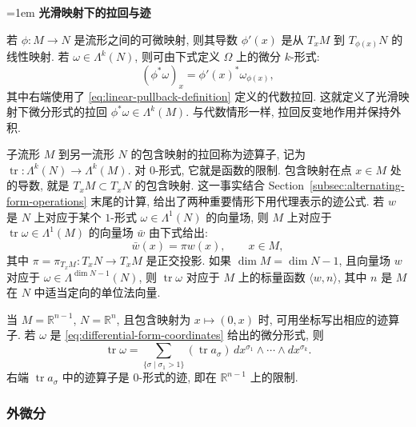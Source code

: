 \begingroup\emergencystretch=1em
\medskip\noindent\textbf{{光滑映射下的拉回与迹}}\par
{若 $\phi:M\to N$ 是流形之间的可微映射, 则其导数 $\phi'(x)$ 是从 $T_xM$ 到 $T_{\phi(x)}N$ 的线性映射. 若 $\omega\in\Lambda^k(N)$, 则可由下式定义 $\Omega$ 上的微分 $k$-形式:}
\begin{equation}\label{eq:smooth-pullback-definition}
(\phi^*\omega)_x=\phi'(x)^*\omega_{\phi(x)},
\end{equation}
{其中右端使用了 \eqref{eq:linear-pullback-definition} 定义的代数拉回. 这就定义了光滑映射下微分形式的拉回 $\phi^*\omega\in\Lambda^k(M)$. 与代数情形一样, 拉回反变地作用并保持外积.}

\par\endgroup
{子流形 $M$ 到另一流形 $N$ 的包含映射的拉回称为迹算子, 记为 $\operatorname{tr}:\Lambda^k(N)\to\Lambda^k(M)$. 对 $0$-形式, 它就是函数的限制. 包含映射在点 $x\in M$ 处的导数, 就是 $T_xM\subset T_xN$ 的包含映射. 这一事实结合 Section~\ref{subsec:alternating-form-operations} 末尾的计算, 给出了两种重要情形下用代理表示的迹公式. 若 $w$ 是 $N$ 上对应于某个 $1$-形式 $\omega\in\Lambda^1(N)$ 的向量场, 则 $M$ 上对应于 $\operatorname{tr}\omega\in\Lambda^1(M)$ 的向量场 $\bar w$ 由下式给出:}
\[
\bar w(x)=\pi w(x),\qquad x\in M,
\]
{其中 $\pi=\pi_{T_xM}:T_xN\to T_xM$ 是正交投影. 如果 $\dim M=\dim N-1$, 且向量场 $w$ 对应于 $\omega\in\Lambda^{\dim N-1}(N)$, 则 $\operatorname{tr}\omega$ 对应于 $M$ 上的标量函数 $\langle w,n\rangle$, 其中 $n$ 是 $M$ 在 $N$ 中适当定向的单位法向量.}

{当 $M=\mathbb R^{n-1}$, $N=\mathbb R^n$, 且包含映射为 $x\mapsto(0,x)$ 时, 可用坐标写出相应的迹算子. 若 $\omega$ 是 \eqref{eq:differential-form-coordinates} 给出的微分形式, 则}
\begin{equation}\label{eq:differential-trace-coordinates}
\operatorname{tr}\omega=\sum_{\{\sigma\mid\sigma_1>1\}}(\operatorname{tr}a_\sigma)\,dx^{\sigma_1}\wedge\cdots\wedge dx^{\sigma_k}.
\end{equation}
{右端 $\operatorname{tr}a_\sigma$ 中的迹算子是 $0$-形式的迹, 即在 $\mathbb R^{n-1}$ 上的限制.}

\subsubsection{{外微分}}\label{subsec:exterior-derivative}


